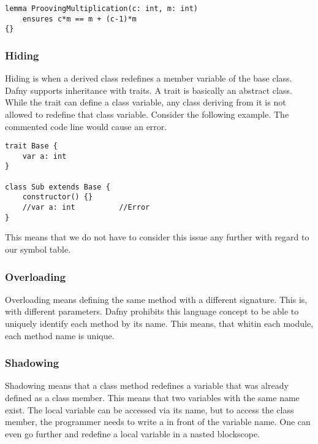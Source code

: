 \begin{lstlisting}[caption={Lemma}, captionpos=b, label={lst:lemma}]
lemma ProovingMultiplication(c: int, m: int)
    ensures c*m == m + (c-1)*m
{}
\end{lstlisting}

\subsubsection{Hiding}
Hiding is when a derived class redefines a member variable of the base class. Dafny supports inheritance with traits. A trait is basically an abstract class. While the trait can define a class variable, any class deriving from it is not allowed to redefine that class variable. Consider the following example. The commented code line would cause an error. \cite{dafnyReferenceManual}

\begin{lstlisting}[caption={Hiding}, captionpos=b, label={lst:hiding}]
trait Base {
    var a: int
}

class Sub extends Base {
    constructor() {}
    //var a: int          //Error
}
\end{lstlisting}

This means that we do not have to consider this issue any further with regard to our symbol table.

\subsubsection{Overloading}
Overloading means defining the same method with a different signature. This is, with different parameters. Dafny prohibits this language concept to be able to uniquely identify each method by its name. \cite{dafnyReferenceManual}
This means, that whitin each module, each method name is unique.

\subsubsection{Shadowing}

Shadowing means that a class method redefines a variable that was already defined as a class member. This means that two variables with the same name exist. The local variable can be accessed via its name, but to access the class member, the programmer needs to write a  in front of the variable name. One can even go further and redefine a local variable in a nasted blockscope.\\


